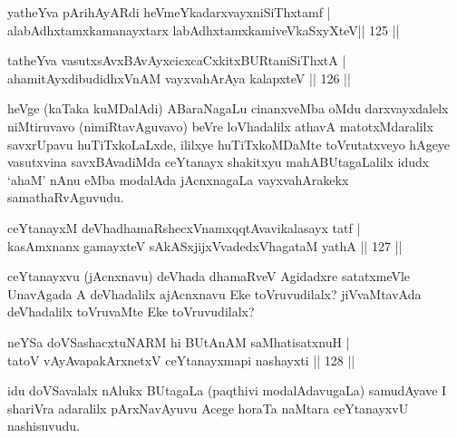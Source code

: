 
\begin{shl}
yatheYva pArihAyARdi heVmeYkadarxvayxniSiThxtamf | \\
alabAdhxtamxkamanayxtarx labAdhxtamxkamiveVkaSxyXteV\hfill ||  125 ||  
\end{shl}
				
\begin{shl}
tatheYva vasutxsAvxBAvAyxcicxcaCxkitxBURtaniSiThxtA  | \\
ahamitAyxdibudidhxVnAM vayxvahArAya kalapxteV \hfill||  126 ||  
\end{shl}

\begin{artha}
heVge (kaTaka kuMDalAdi) ABaraNagaLu cinanxveMba oMdu darxvayxdalelx niMtiruvavo (nimiRtavAguvavo) beVre loVhadalilx athavA matotxMdaralilx savxrUpavu huTiTxkoLaLxde, ililxye huTiTxkoMDaMte toVrutatxveyo hAgeye vasutxvina savxBAvadiMda ceYtanayx shakitxyu mahABUtagaLalilx idudx `ahaM' nAnu eMba modalAda jAcnxnagaLa vayxvahArakekx samathaRvAguvudu.
\end{artha}


\begin{shl}
ceYtanayxM deVhadhamaRshecxVnamxqqtAvavikalasayx tatf | \\
kasAmxnanx gamayxteV sAkASxjijxVvadedxVhagataM yathA \hfill||  127 ||  
\end{shl}

\begin{artha}
ceYtanayxvu (jAcnxnavu) deVhada dhamaRveV Agidadxre satatxmeVle UnavAgada A deVhadalilx ajAcnxnavu Eke toVruvudilalx? jiVvaMtavAda deVhadalilx toVruvaMte Eke toVruvudilalx?
\end{artha}


\begin{shl}
neYSa doVSashacxtuNARM hi BUtAnAM saMhatisatxnuH | \\
tatoV vAyAvapakArxnetxV ceYtanayxmapi nashayxti \hfill||  128 ||  
\end{shl}

\begin{artha}
idu doVSavalalx nAlukx BUtagaLa (paqthivi modalAdavugaLa) samudAyave I shariVra adaralilx pArxNavAyuvu Acege horaTa naMtara ceYtanayxvU nashisuvudu. 
\end{artha}



